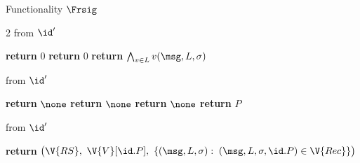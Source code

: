 \begin{interface}[nofloat]{Functionality $\Frsig$ \\
}
{\begin{multicols}{2}
 \quad from $\id'$
\begin{algorithmic}[1]
\algcont
{} \label{ln:rsiguf}
    \State \textbf{return} $0$ \label{ln:rsigeuf}
  \EndIf
    \State \textbf{return} $0$ \label{ln:rsigsuf}
  \EndIf
\EndIf
\State \textbf{return} $\bigwedge_{v \in L} v(\msg, L, \sigma)$ \label{ln:rsigdet}
\algsave
\end{algorithmic}
\vspace{1.4ex}

 \quad from $\id'$
\begin{algorithmic}[1]
\algcont
{} \label{ln:rsigadvonly}
  \State \textbf{return} $\none$ \label{ln:rsigfull}
\EndIf
{}
  \State \textbf{return} $\none$ \label{ln:rsigbasic}
\EndIf
{}
  \State \textbf{return} $\none$ \label{ln:rsigattr}
\EndIf
\State \textbf{return} $P$ \label{ln:rsignoanon}
\algsave
\end{algorithmic}
\vspace{1.4ex}

 \quad from $\id'$
\begin{algorithmic}[1]
\algcont
{} \label{ln:rsigleak}
\State \textbf{return} $\bigl(\V{RS},\ \V{V}[\id.P],\ \{(\msg, L, \sigma) :$
\Statex $(\msg, L, \sigma, \id.P) \in \V{Rec}\}\bigr)$
\algsave
\end{algorithmic}
\end{multicols}}
\end{interface}
